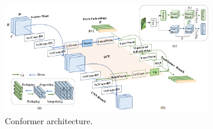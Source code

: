 \begin{figure}[t]
    \centering
    \includegraphics[width=0.8\textwidth]{fig/rel/images/conformer.png}
    \caption{Conformer architecture.}
    \label{fig:rel_conformer}
\end{figure}